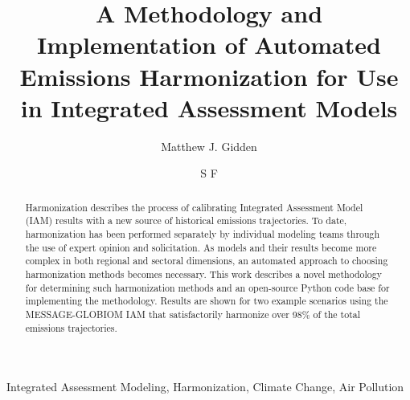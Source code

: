 \begin{frontmatter}

\title{A Methodology and Implementation of Automated Emissions Harmonization for Use in Integrated Assessment Models}

\author[iiasa]{Matthew J. Gidden}

\author[iiasa,nies]{S F}

\address[iiasa]{International Institute for Applied Systems Analysis,
  Schlossplatz 1, A-2361 Laxenburg, Austria}
\address[nies]{National Institute for Environmental Studies, Tsukuba, Japan}

\begin{abstract}
Harmonization describes the process of calibrating Integrated Assessment Model
(IAM) results with a new source of historical emissions trajectories. To date,
harmonization has been performed separately by individual modeling teams through
the use of expert opinion and solicitation. As models and their results become
more complex in both regional and sectoral dimensions, an automated approach to
choosing harmonization methods becomes necessary. This work describes a novel
methodology for determining such harmonization methods and an open-source Python
code base for implementing the methodology. Results are shown for two example
scenarios using the MESSAGE-GLOBIOM IAM that satisfactorily harmonize over 98\%
of the total emissions trajectories. \cite{Dirac1953888}
\end{abstract}

\begin{keyword}
Integrated Assessment Modeling, Harmonization, Climate Change, Air Pollution 
\end{keyword}

\end{frontmatter}

\linenumbers
